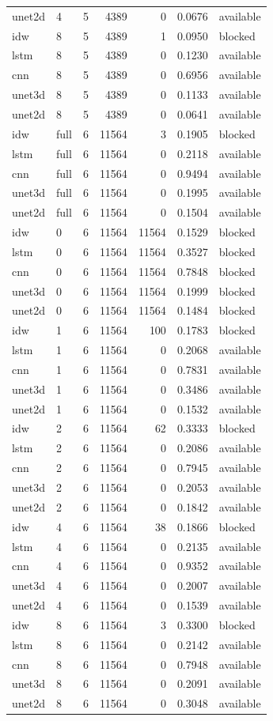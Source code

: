 \begin{tabular}{llrrrrl}
unet2d & 4 & 5 & 4389 & 0 & 0.0676 & available \\
idw & 8 & 5 & 4389 & 1 & 0.0950 & blocked \\
lstm & 8 & 5 & 4389 & 0 & 0.1230 & available \\
cnn & 8 & 5 & 4389 & 0 & 0.6956 & available \\
unet3d & 8 & 5 & 4389 & 0 & 0.1133 & available \\
unet2d & 8 & 5 & 4389 & 0 & 0.0641 & available \\
idw & full & 6 & 11564 & 3 & 0.1905 & blocked \\
lstm & full & 6 & 11564 & 0 & 0.2118 & available \\
cnn & full & 6 & 11564 & 0 & 0.9494 & available \\
unet3d & full & 6 & 11564 & 0 & 0.1995 & available \\
unet2d & full & 6 & 11564 & 0 & 0.1504 & available \\
idw & 0 & 6 & 11564 & 11564 & 0.1529 & blocked \\
lstm & 0 & 6 & 11564 & 11564 & 0.3527 & blocked \\
cnn & 0 & 6 & 11564 & 11564 & 0.7848 & blocked \\
unet3d & 0 & 6 & 11564 & 11564 & 0.1999 & blocked \\
unet2d & 0 & 6 & 11564 & 11564 & 0.1484 & blocked \\
idw & 1 & 6 & 11564 & 100 & 0.1783 & blocked \\
lstm & 1 & 6 & 11564 & 0 & 0.2068 & available \\
cnn & 1 & 6 & 11564 & 0 & 0.7831 & available \\
unet3d & 1 & 6 & 11564 & 0 & 0.3486 & available \\
unet2d & 1 & 6 & 11564 & 0 & 0.1532 & available \\
idw & 2 & 6 & 11564 & 62 & 0.3333 & blocked \\
lstm & 2 & 6 & 11564 & 0 & 0.2086 & available \\
cnn & 2 & 6 & 11564 & 0 & 0.7945 & available \\
unet3d & 2 & 6 & 11564 & 0 & 0.2053 & available \\
unet2d & 2 & 6 & 11564 & 0 & 0.1842 & available \\
idw & 4 & 6 & 11564 & 38 & 0.1866 & blocked \\
lstm & 4 & 6 & 11564 & 0 & 0.2135 & available \\
cnn & 4 & 6 & 11564 & 0 & 0.9352 & available \\
unet3d & 4 & 6 & 11564 & 0 & 0.2007 & available \\
unet2d & 4 & 6 & 11564 & 0 & 0.1539 & available \\
idw & 8 & 6 & 11564 & 3 & 0.3300 & blocked \\
lstm & 8 & 6 & 11564 & 0 & 0.2142 & available \\
cnn & 8 & 6 & 11564 & 0 & 0.7948 & available \\
unet3d & 8 & 6 & 11564 & 0 & 0.2091 & available \\
unet2d & 8 & 6 & 11564 & 0 & 0.3048 & available \\
\bottomrule
\end{tabular}
